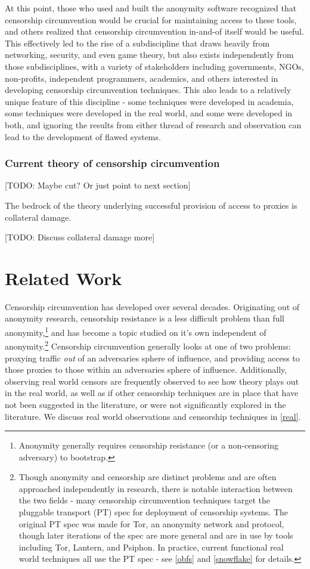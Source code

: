 \documentclass[12pt]{report}
\begin{document}
At this point, those who used and built the anonymity software recognized that censorship circumvention would be crucial for maintaining access to these tools, and others realized that censorship circumvention in-and-of itself would be useful. This effectively led to the rise of a subdiscipline that draws heavily from networking, security, and even game theory, but also exists independently from those subdisciplines, with a variety of stakeholders including governments, NGOs, non-profits, independent programmers, academics, and others interested in developing censorship circumvention techniques. This also leads to a relatively unique feature of this discipline - some techniques were developed in academia, some techniques were developed in the real world, and some were developed in both, and ignoring the results from either thread of research and observation can lead to the development of flawed systems.

\subsection{Current theory of censorship circumvention}

[TODO: Maybe cut? Or just point to next section]

The bedrock of the theory underlying successful provision of access to proxies is collateral damage.

[TODO: Discuss collateral damage more]

\chapter{Related Work}

Censorship circumvention has developed over several decades. Originating out of anonymity research, censorship resistance is a less difficult problem than full anonymity,\footnote{Anonymity generally requires censorship resistance (or a non-censoring adversary) to bootstrap.} and has become a topic studied on it's own independent of anonymity.\footnote{Though anonymity and censorship are distinct problems and are often approached independently in research, there is notable interaction between the two fields - many censorship circumvention techniques target the pluggable transport (PT) spec for deployment of censorship systems. The original PT spec was made for Tor, an anonymity network and protocol,\cite{tor} though later iterations of the spec are more general and are in use by tools including Tor, Lantern, and Psiphon.\label{pt}\cite{pt} In practice, current functional real world techniques all use the PT spec - see \ref{obfs} and \ref{snowflake} for details.} Censorship circumvention generally looks at one of two problems: proxying traffic \emph{out} of an adversaries sphere of influence, and providing access to those proxies to those within an adversaries sphere of influence. Additionally, observing real world censors are frequently observed to see how theory plays out in the real world, as well as if other censorship techniques are in place that have not been suggested in the literature, or were not significantly explored in the literature. We discuss real world observations and censorship techniques in \ref{real}.
\end{document}
